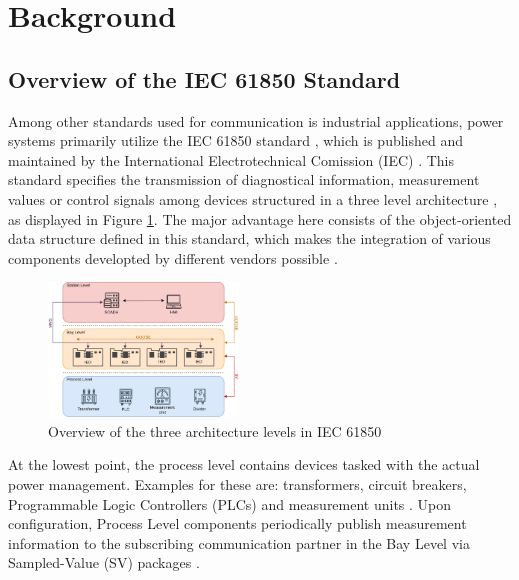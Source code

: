 \documentclass[conference]{IEEEtran}
\begin{document}
\section{Background}


\subsection{Overview of the IEC 61850 Standard}
\label{chapter:fundamentalsIEC}
Among other standards used for communication is industrial applications, power systems primarily utilize the IEC 61850 standard \cite{IEC61850:2023}, 
which is published and maintained by the International Electrotechnical Comission (IEC) \cite{IEC61850_Overview:2006}. This standard specifies the 
transmission of diagnostical information, measurement values or control signals among devices structured in a three level architecture 
\cite{SGRWin_IEC61850Architecture:2021}, as displayed in Figure \ref{image:IEC61850Architecture}. The major advantage here consists of the object-oriented 
data structure defined in this standard, which makes the integration of various components developted by different vendors possible 
\cite[p. 5643]{Review_IEC62351:2019}. 

\begin{figure}[h]
    \centering
    \includegraphics[width=0.45\textwidth]{images/IEC61850_Architecture.png}
    \caption{Overview of the three architecture levels in IEC 61850 \cite{SGRWin_IEC61850Architecture:2021}}
    \label{image:IEC61850Architecture}
\end{figure}

At the lowest point, the process level contains devices tasked with the actual power management. Examples for these are: transformers, circuit breakers, 
Programmable Logic Controllers (PLCs) and measurement units \cite{SGRWin_IEC61850Architecture:2021}. Upon configuration, Process Level components periodically 
publish measurement information to the subscribing communication partner in the Bay Level via Sampled-Value (SV) packages \cite{TyphoonHIL_IEC61850SV:2021}. 
\end{document}
